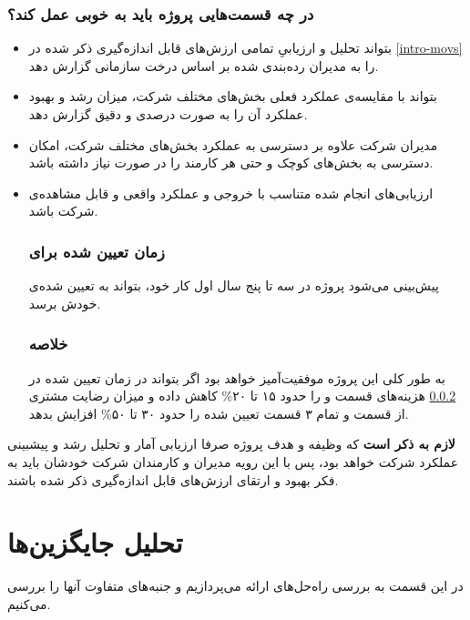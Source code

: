 \documentclass[12pt]{article}
\begin{document}
\subsubsection{در چه قسمت‌هایی پروژه باید به خوبی عمل کند؟}
\begin{itemize}
    \item 
    بتواند تحلیل و ارزیابیِ تمامی ارزش‌های قابل‌ اندازه‌گیری ذکر شده در \ref{intro-movs} را به مدیران رده‌بندی‌ شده بر اساس درخت سازمانی گزارش دهد.
    \item 
    بتواند با مقایسه‌ی عملکرد فعلی بخش‌های مختلف شرکت، میزان رشد و بهبود عملکرد آن را به صورت درصدی و دقیق گزارش دهد.
    \item
    مدیران شرکت علاوه‌ بر دسترسی به عملکرد بخش‌های مختلف شرکت، امکان دسترسی به بخش‌های کوچک و حتی هر کارمند را در صورت نیاز داشته باشد.

    \item 
    ارزیابی‌های انجام شده متناسب‌ با خروجی و عملکرد واقعی و قابل مشاهده‌ی شرکت باشد.
    
\subsubsection{زمان تعیین شده برای }\label{time}
پیش‌بینی می‌شود پروژه در سه تا پنج سال اول کار خود، بتواند به  تعیین شده‌ی خودش برسد.
\subsubsection{خلاصه‌} 
به طور کلی این پروژه موفقیت‌آمیز خواهد بود اگر بتواند در زمان تعیین شده در \ref{time}
هزینه‌های قسمت  و 
را حدود ۱۵ تا ۲۰\% کاهش داده و میزان رضایت مشتری از قسمت  و تمام ۳ قسمت تعیین شده را حدود ۳۰ تا ۵۰\% افزایش بدهد.
\end{itemize}

\textbf{لازم به ذکر است}
 که وظیفه و هدف پروژه صرفا ارزیابی آمار و تحلیل رشد و پیشبینی عملکرد شرکت خواهد بود، پس با این رویه مدیران و کارمندان شرکت خودشان باید به فکر بهبود و ارتقای ارزش‌های قابل اندازه‌گیری ذکر شده باشند.
 
\section{تحلیل جایگزین‌ها}
در این قسمت به بررسی راه‌حل‌های ارائه می‌پردازیم و جنبه‌های متفاوت‌ آنها را بررسی می‌کنیم.
\end{document}
